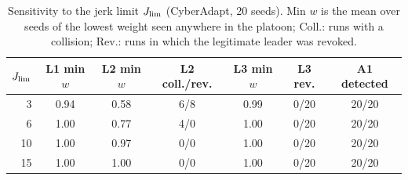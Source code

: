 \begin{table}[!t]\centering\caption{Sensitivity to the jerk limit $J_{\rm lim}$ (CyberAdapt, 20 seeds). Min $w$ is the mean over seeds of the lowest weight seen anywhere in the platoon; Coll.: runs with a collision; Rev.: runs in which the legitimate leader was revoked.}\label{tab:jsweep}\footnotesize\setlength{\tabcolsep}{2pt}\begin{tabular}{rcccccc}\toprule
$J_{\rm lim}$ & L1 min $w$ & L2 min $w$ & L2 coll./rev. & L3 min $w$ & L3 rev. & A1 detected\\\midrule
3 & 0.94 & 0.58 & 6/8 & 0.99 & 0/20 & 20/20\\
6 & 1.00 & 0.77 & 4/0 & 1.00 & 0/20 & 20/20\\
10 & 1.00 & 0.97 & 0/0 & 1.00 & 0/20 & 20/20\\
15 & 1.00 & 1.00 & 0/0 & 1.00 & 0/20 & 20/20\\
\bottomrule\end{tabular}\end{table}